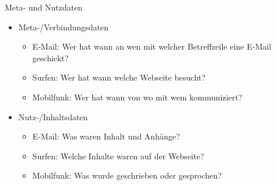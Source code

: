   \begin{frame}{Meta- und Nutzdaten}
    \begin{itemize}
      \item Meta-/Verbindungsdaten
      \begin{itemize}
        \item E-Mail: Wer hat wann an wen mit welcher Betreffzeile eine E-Mail geschickt?
        \item Surfen: Wer hat wann welche Webseite besucht?
        \item Mobilfunk: Wer hat wann von wo mit wem kommuniziert?
      \end{itemize}
      \item Nutz-/Inhaltsdaten
      \begin{itemize}
        \item E-Mail: Was waren Inhalt und Anhänge?
        \item Surfen: Welche Inhalte waren auf der Webseite?
        \item Mobilfunk: Was wurde geschrieben oder gesprochen?
      \end{itemize}
    \end{itemize}
  \end{frame}

